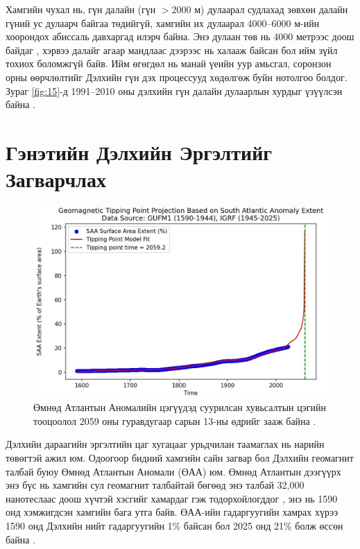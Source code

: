 \documentclass[10pt,twocolumn,letterpaper]{article}
\begin{document}
Хамгийн чухал нь, гүн далайн (гүн $>$2000 м) дулаарал судлахад зөвхөн далайн гүний ус дулаарч байгаа төдийгүй, хамгийн их дулаарал 4000–6000 м-ийн хоорондох абиссаль давхаргад илэрч байна. Энэ дулаан төв нь 4000 метрээс доош байдаг \cite{132,129}, хэрвээ далайг агаар мандлаас дээрээс нь халааж байсан бол ийм зүйл тохиох боломжгүй байв. Ийм өгөгдөл нь манай үеийн уур амьсгал, соронзон орны өөрчлөлтийг Дэлхийн гүн дэх процессууд хөдөлгөж буйн нотолгоо болдог. Зураг \ref{fig:15}-д 1991–2010 оны дэлхийн гүн далайн дулаарлын хурдыг үзүүлсэн байна \cite{132}.

\section{Гэнэтийн Дэлхийн Эргэлтийг Загварчлах}
\begin{figure}[b]
\begin{center}
   \includegraphics[width=1\linewidth]{saa-crop.jpeg}
\end{center}
   \caption{Өмнөд Атлантын Аномалийн цэгүүдэд суурилсан хувьсалтын цэгийн тооцоолол 2059 оны гуравдугаар сарын 13-ны өдрийг зааж байна \cite{125,126}.}
\label{fig:16}
\label{fig:onecol}
\end{figure}

Дэлхийн дараагийн эргэлтийн цаг хугацааг урьдчилан таамаглах нь нарийн төвөгтэй ажил юм. Одоогоор бидний хамгийн сайн загвар бол Дэлхийн геомагнит талбай буюу Өмнөд Атлантын Аномали (ӨАА) юм. Өмнөд Атлантын дээгүүрх энэ бүс нь хамгийн сул геомагнит талбайтай бөгөөд энэ талбай 32,000 нанотеслаас доош хүчтэй хэсгийг хамардаг гэж тодорхойлогддог \cite{135}, энэ нь 1590 онд хэмжигдсэн хамгийн бага утга байв. ӨАА-ийн гадаргуугийн хамрах хүрээ 1590 онд Дэлхийн нийт гадаргуугийн 1\% байсан бол 2025 онд 21\% болж өссөн байна \cite{136}.
\end{document}
